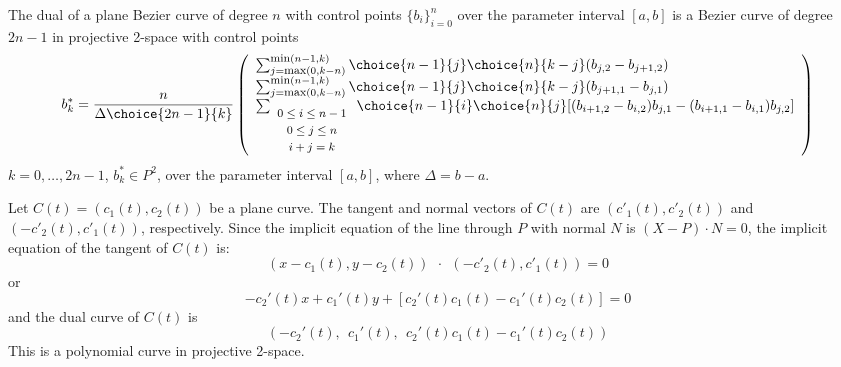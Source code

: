 \documentclass[11pt]{article}
\begin{document}
\begin{theorem}
The dual of a plane Bezier curve of degree $n$
with control points $\{ b_i \}_{i=0}^n$ over the parameter interval
$[a,b]$ is a Bezier curve
of degree $2n-1$ in projective 2-space with control points 
\begin{equation}
\label{eq:dualcoord}
b^*_k = 
\frac{n}{\Delta \choice{2n-1}{k}} 
\left(
\begin{array}{l}
	\sum_{j=\mbox{\footnotesize{max}}(0,k-n)}^{\mbox{\footnotesize{min}}(n-1,k)} 
	\choice{n-1}{j} \choice{n}{k-j} (b_{j,2} - b_{j+1,2})\\
	\sum_{j=\mbox{\footnotesize{max}}(0,k-n)}^{\mbox{\footnotesize{min}}(n-1,k)} 
	\choice{n-1}{j} \choice{n}{k-j} (b_{j+1,1} - b_{j,1})\\
\sum_{\begin{array}{c} \mbox{\footnotesize{$0 \leq i \leq n-1$}} \\ 
			     \mbox{\footnotesize{$0 \leq j \leq n$}} \\ 
			     \mbox{\footnotesize{$i+j=k$}}
			     \end{array}}
\choice{n-1}{i} \choice{n}{j}
[ (b_{i+1,2} - b_{i,2}) b_{j,1} - (b_{i+1,1} - b_{i,1}) b_{j,2} ]
\end{array}
\right)
\end{equation}
$k=0,\ldots,2n-1$, $b^*_k \in P^2$, over the parameter interval $[a,b]$, where
$\Delta = b-a$.
\end{theorem}
\prf
Let $C(t) = (c_1(t), c_2(t))$ be a plane curve.
The tangent and normal vectors of $C(t)$ are $(c'_1(t),c'_2(t))$
and $(-c'_2(t), c'_1(t))$, respectively.
Since the implicit equation of the line through $P$ with normal $N$ is 
$(X-P) \cdot N = 0$,
the implicit equation of the tangent of $C(t)$ is:
\[	
	(x-c_1(t), y-c_2(t))\ \  \cdot \ \ (-c'_2(t), c'_1(t)) = 0
\]
or
\[
	-c_2'(t) x + c_1'(t) y + [c_2'(t) c_1(t) - c_1'(t)c_2(t)] = 0 
\]
and the dual curve of $C(t)$ is
\begin{equation}
\label{eq:dual1}
  (-c_2'(t),\ \  c_1'(t),\ \ c_2'(t) c_1(t) - c_1'(t)c_2(t))
\end{equation}
%
This is a polynomial curve in projective 2-space.
\end{document}
